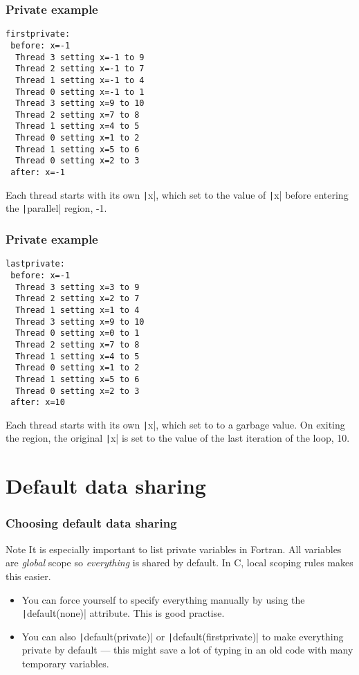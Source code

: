 \documentclass{beamer}
\begin{document}
\begin{frame}[fragile]
\frametitle{Private example}
\begin{verbatim}
firstprivate:
 before: x=-1
  Thread 3 setting x=-1 to 9
  Thread 2 setting x=-1 to 7
  Thread 1 setting x=-1 to 4
  Thread 0 setting x=-1 to 1
  Thread 3 setting x=9 to 10
  Thread 2 setting x=7 to 8
  Thread 1 setting x=4 to 5
  Thread 0 setting x=1 to 2
  Thread 1 setting x=5 to 6
  Thread 0 setting x=2 to 3
 after: x=-1
\end{verbatim}
Each thread starts with its own \texttt|x|, which set to the value of \texttt|x| before entering the \texttt|parallel| region, -1.
\end{frame}

\begin{frame}[fragile]
\frametitle{Private example}
\begin{verbatim}
lastprivate:
 before: x=-1
  Thread 3 setting x=3 to 9
  Thread 2 setting x=2 to 7
  Thread 1 setting x=1 to 4
  Thread 3 setting x=9 to 10
  Thread 0 setting x=0 to 1
  Thread 2 setting x=7 to 8
  Thread 1 setting x=4 to 5
  Thread 0 setting x=1 to 2
  Thread 1 setting x=5 to 6
  Thread 0 setting x=2 to 3
 after: x=10
\end{verbatim}
Each thread starts with its own \texttt|x|, which set to to a garbage value.
On exiting the region, the original \texttt|x| is set to the value of the last iteration of the loop, 10.
\end{frame}

\section{Default data sharing}
\begin{frame}
\frametitle{Choosing default data sharing}
\begin{alertblock}{Note}
It is especially important to list private variables in Fortran.
All variables are \emph{global} scope so \emph{everything} is shared by default.
In C, local scoping rules makes this easier.
\end{alertblock}

\begin{itemize}
  \item You can force yourself to specify everything manually by using the \texttt|default(none)| attribute. This is good practise.
  \item You can also \texttt|default(private)| or \texttt|default(firstprivate)| to make everything private by default --- this might save a lot of typing in an old code with many temporary variables.
\end{itemize}

\end{frame}
\end{document}

